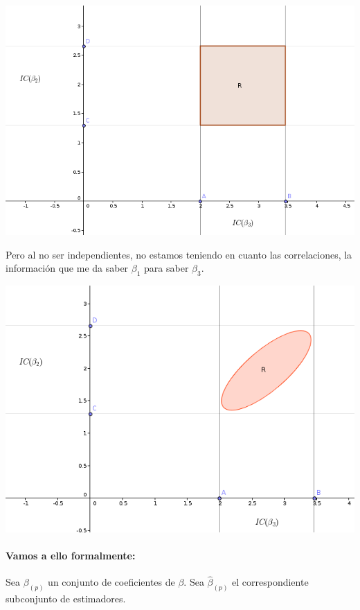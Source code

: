 \begin{center}
\includegraphics[scale=0.5]{img/confianzamultivariantemal.png}
\end{center}

 Pero al no ser independientes, no estamos teniendo en cuanto las correlaciones, la información que me da saber $β_1$ para saber $β_3$.

\begin{center}
\includegraphics[scale=0.5]{img/confianzamultivariantebien.png}
\end{center}

\paragraph{Vamos a ello formalmente:}
\newcommand{\bpp}{β_{(p)}}
\newcommand{\hbpp}{\hat{β}_{(p)}}
\newcommand{\fpnk}{F_{p,n-k-1}}
Sea $β_{(p)}$ un conjunto de coeficientes de $β$. Sea $\hbpp$ el correspondiente subconjunto de estimadores.

